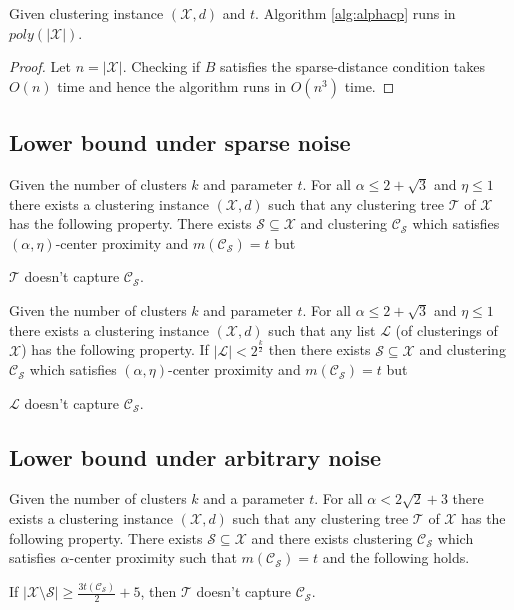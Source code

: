 \documentclass[orivec]{llncs}
\newcommand{\mc}{\mathcal}
\begin{document}
\begin{theorem}
\label{thm:algcptime}
Given clustering instance $(\mc X, d)$ and $t$. Algorithm \ref{alg:alphacp} runs in  $poly(|\mc X|)$.
\end{theorem}

\begin{proof}
Let $n = |\mc X|$. Checking if $B$ satisfies the sparse-distance condition takes $O(n)$ time and hence the algorithm runs in $O(n^3)$ time.
\end{proof}

\subsection{Lower bound under sparse noise}
\label{section:alphaLowerBoundSparse}
\begin{theorem}
\label{thm:noalgalphacp}
Given the number of clusters $k$ and parameter $t$. For all $\alpha \le 2+\sqrt{3}$ and $\eta \le 1$ there exists a clustering instance $(\mc X, d)$ such that any clustering tree $\mc T$ of $\mc X$ has  the following property. There exists $\mc S \subseteq \mc X$ and clustering $\mc C_{\mc S}$ which satisfies $(\alpha, \eta)$-center proximity and $ m(\mc C_{\mc S}) = t$ but 

$\mc T$ doesn't capture $\mc C_{\mc S}$.
\end{theorem}

\begin{theorem}
\label{thm:nolistalphacp}
Given the number of clusters $k$ and parameter $t$. For all $\alpha \le 2+\sqrt{3}$ and $\eta \le 1$ there exists a clustering instance $(\mc X, d)$ such that any list $\mc L$ (of clusterings of $\mc X$) has  the following property. If $|\mc L| < 2^{\frac{k}{2}}$ then there exists $\mc S \subseteq \mc X$ and clustering $\mc C_{\mc S}$ which satisfies $(\alpha, \eta)$-center proximity and $ m(\mc C_{\mc S}) = t$ but 

$\mc L$ doesn't capture $\mc C_{\mc S}$.
\end{theorem}

\subsection{Lower bound under arbitrary noise}
\label{section:alphaLowerBoundArbitrary}

\begin{theorem}
\label{thm:nosparsealg}
Given the number of clusters $k$ and a parameter $t$. For all $\alpha < 2\sqrt 2 + 3$ there exists a clustering instance $(\mc X, d)$ such that any clustering tree $\mc T$ of $\mc X$ has  the following property. There exists $\mc S \subseteq \mc X$ and there exists clustering $\mc C_{\mc S}$ which satisfies $\alpha$-center proximity such that $m(\mc C_{\mc S}) = t$ and the following holds. 

If $|\mc X \setminus \mc S| \ge \frac{3t(\mc C_{\mc S})}{2}+5$, then $\mc T$ doesn't capture $\mc C_{\mc S}$.
\end{theorem}
\end{document}
